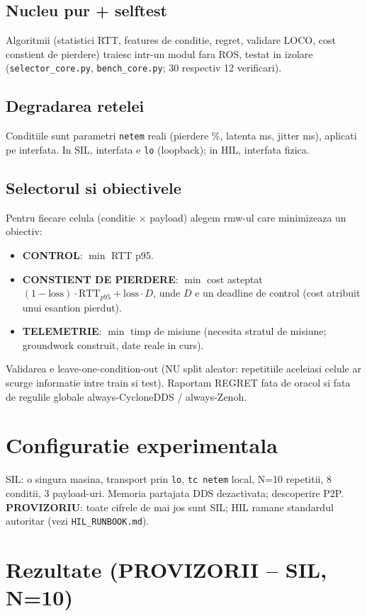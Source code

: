 \documentclass[11pt]{article}
\begin{document}
\subsection{Nucleu pur + selftest}
Algoritmii (statistici RTT, features de conditie, regret, validare LOCO, cost constient de
pierdere) traiesc intr-un modul fara ROS, testat in izolare
(\texttt{selector\_core.py}, \texttt{bench\_core.py}; 30 respectiv 12 verificari).
\subsection{Degradarea retelei}
Conditiile sunt parametri \texttt{netem} reali (pierdere \%, latenta ms, jitter ms),
aplicati pe interfata. In SIL, interfata e \texttt{lo} (loopback); in HIL, interfata fizica.
\subsection{Selectorul si obiectivele}
Pentru fiecare celula (conditie $\times$ payload) alegem rmw-ul care minimizeaza un obiectiv:
\begin{itemize}
  \item \textbf{CONTROL}: $\min$ RTT p95.
  \item \textbf{CONSTIENT DE PIERDERE}: $\min$ cost asteptat
        $(1-\text{loss})\cdot \text{RTT}_{p95} + \text{loss}\cdot D$, unde $D$ e un deadline
        de control (cost atribuit unui esantion pierdut).
  \item \textbf{TELEMETRIE}: $\min$ timp de misiune (necesita stratul de misiune; groundwork
        construit, date reale in curs).
\end{itemize}
Validarea e leave-one-condition-out (NU split aleator: repetitiile aceleiasi celule ar
scurge informatie intre train si test). Raportam REGRET fata de oracol si fata de regulile
globale always-CycloneDDS / always-Zenoh.

\section{Configuratie experimentala}
SIL: o singura masina, transport prin \texttt{lo}, \texttt{tc netem} local, N=10 repetitii,
8 conditii, 3 payload-uri. Memoria partajata DDS dezactivata; descoperire P2P.
\textbf{PROVIZORIU}: toate cifrele de mai jos sunt SIL; HIL ramane standardul autoritar
(vezi \texttt{HIL\_RUNBOOK.md}).

\section{Rezultate (PROVIZORII -- SIL, N=10)}
\end{document}
